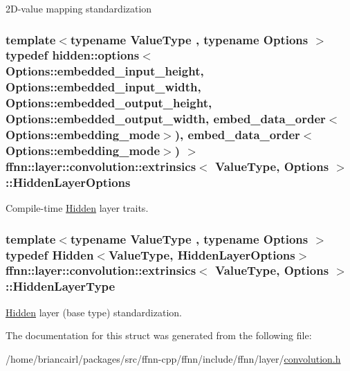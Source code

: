 2\-D-\/value mapping standardization 

\hypertarget{structffnn_1_1layer_1_1convolution_1_1extrinsics_a301768029fa1eb16a28981139c8122ce}{
\subsubsection[{Hidden\-Layer\-Options}]{\setlength{\rightskip}{0pt plus 5cm}template$<$typename Value\-Type , typename Options $>$ typedef {\bf hidden\-::options}$<$ Options\-::embedded\-\_\-input\-\_\-height, Options\-::embedded\-\_\-input\-\_\-width, Options\-::embedded\-\_\-output\-\_\-height, Options\-::embedded\-\_\-output\-\_\-width, {\bf embed\-\_\-data\-\_\-order}$<$Options\-::embedding\-\_\-mode$>$), {\bf embed\-\_\-data\-\_\-order}$<$Options\-::embedding\-\_\-mode$>$) $>$ {\bf ffnn\-::layer\-::convolution\-::extrinsics}$<$ Value\-Type, Options $>$\-::{\bf Hidden\-Layer\-Options}}}\label{structffnn_1_1layer_1_1convolution_1_1extrinsics_a301768029fa1eb16a28981139c8122ce}


Compile-\/time \hyperlink{classffnn_1_1layer_1_1_hidden}{Hidden} layer traits. 

\hypertarget{structffnn_1_1layer_1_1convolution_1_1extrinsics_a92f9ad843e8bb328d35604bdb4d6c87f}{
\subsubsection[{Hidden\-Layer\-Type}]{\setlength{\rightskip}{0pt plus 5cm}template$<$typename Value\-Type , typename Options $>$ typedef {\bf Hidden}$<$Value\-Type, {\bf Hidden\-Layer\-Options}$>$ {\bf ffnn\-::layer\-::convolution\-::extrinsics}$<$ Value\-Type, Options $>$\-::{\bf Hidden\-Layer\-Type}}}\label{structffnn_1_1layer_1_1convolution_1_1extrinsics_a92f9ad843e8bb328d35604bdb4d6c87f}


\hyperlink{classffnn_1_1layer_1_1_hidden}{Hidden} layer (base type) standardization. 



The documentation for this struct was generated from the following file\-:\begin{DoxyCompactItemize}
\item 
/home/briancairl/packages/src/ffnn-\/cpp/ffnn/include/ffnn/layer/\hyperlink{convolution_8h}{convolution.\-h}\end{DoxyCompactItemize}
